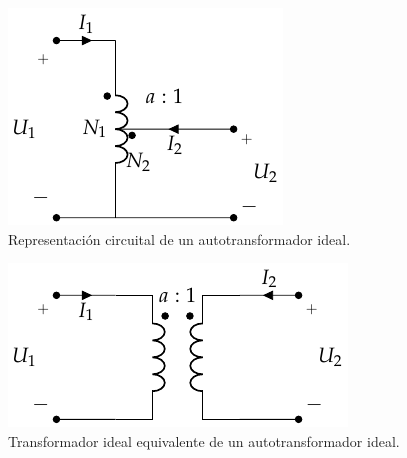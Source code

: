 \begin{figure}
  \centering
  \includegraphics[height=.2\textheight]{../figs/AutoTrafoIdeal.pdf}
  \caption{Representación circuital de un autotransformador ideal.}
  \label{fig:autotrafo-ideal}
\end{figure}
\begin{figure}
  \centering
  \includegraphics[height=.15\textheight]{../figs/Trafo_Ideal.pdf}
  \caption{Transformador ideal equivalente de un autotransformador ideal.}
  \label{fig:autotrafo-ideal-equivalente}
\end{figure}

